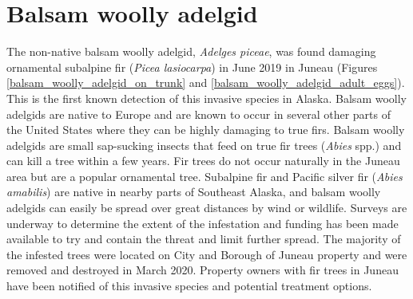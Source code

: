 \section{Balsam woolly adelgid}

The non-native balsam woolly adelgid, \textit{Adelges piceae}, was found damaging ornamental subalpine fir (\textit{Picea lasiocarpa}) in June 2019 in Juneau (Figures \ref{balsam_woolly_adelgid_on_trunk} and \ref{balsam_woolly_adelgid_adult_eggs}). This is the first known detection of this invasive species in Alaska. Balsam woolly adelgids are native to Europe and are known to occur in several other parts of the United States where they can be highly damaging to true firs. Balsam woolly adelgids are small sap-sucking insects that feed on true fir trees (\textit{Abies} spp.) and can kill a tree within a few years. Fir trees do not occur naturally in the Juneau area but are a popular ornamental tree. Subalpine fir and Pacific silver fir (\textit{Abies amabilis})  are native in nearby parts of Southeast Alaska, and balsam woolly adelgids can easily be spread over great distances by wind or wildlife. Surveys are underway to determine the extent of the infestation and funding has been made available to try and contain the threat and limit further spread.  The majority of the infested trees were located on City and Borough of Juneau property and were removed and destroyed in March 2020.  Property owners with fir trees in Juneau have been notified of this invasive species and potential treatment options. 

